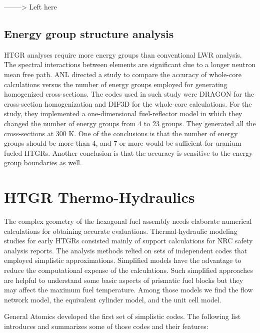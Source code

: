 \documentclass[11pt,letterpaper]{article}
\begin{document}
--------> Left here




\subsection{Energy group structure analysis}

\gls{HTGR} analyses require more energy groups than conventional \gls{LWR} analysis.
The spectral interactions between elements are significant due to a longer neutron mean free path.
\gls{ANL} directed a study \cite{lee_status_2006} to compare the accuracy of whole-core calculations versus the number of energy groups employed for generating homogenized cross-sections.
The codes used in such study were DRAGON for the cross-section homogenization and DIF3D for the whole-core calculations.
For the study, they implemented a one-dimensional fuel-reflector model in which they changed the number of energy groups from 4 to 23 groups.
They generated all the cross-sections at 300 K.
One of the conclusions is that the number of energy groups should be more than 4, and 7 or more would be sufficient for uranium fueled \glspl{HTGR}.
Another conclusion is that the accuracy is sensitive to the energy group boundaries as well.


\section{HTGR Thermo-Hydraulics}

The complex geometry of the hexagonal fuel assembly needs elaborate numerical calculations for obtaining accurate evaluations.
Thermal-hydraulic modeling studies for early \glspl{HTGR} consisted mainly of support calculations for NRC safety analysis reports.
The analysis methods relied on sets of independent codes that employed simplistic approximations.
Simplified models have the advantage to reduce the computational expense of the calculations.
Such simplified approaches are helpful to understand some basic aspects of prismatic fuel blocks but they may affect the maximum fuel temperature.
Among those models we find the flow network model, the equivalent cylinder model, and the unit cell model.

General Atomics \cite{shenoy_htgr_1974} developed the first set of simplistic codes.
The following list introduces and summarizes some of those codes and their features:
\end{document}
